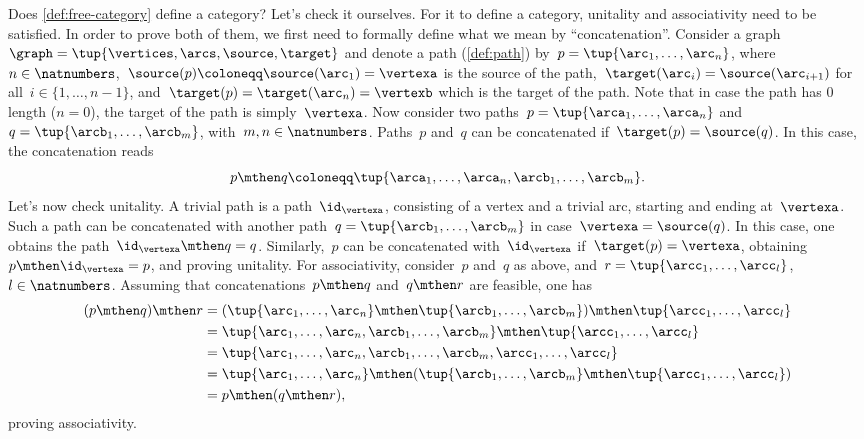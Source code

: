Does \cref{def:free-category} define a category?
Let's check it ourselves.
For it to define a category, unitality and associativity need to be satisfied.
In order to prove both of them, we first need to formally define what we mean by ``concatenation''.
Consider a graph~$\graph=\tup{\vertices,\arcs,\source,\target}$ and denote a path (\cref{def:path}) by~$p=\tup{\arc_1,\ldots, \arc_n}$, where~$n\in \natnumbers$,~$\source(p)\coloneqq\source(\arc_1)=\vertexa$ is the source of the path,~$\target(\arc_i)=\source(\arc_{i+1})$ for all~$i\in \{1,\ldots,n-1\}$, and~$\target(p)=\target(\arc_n)=\vertexb$ which is the target of the path.
Note that in case the path has 0 length ($n=0$), the target of the path is simply~$\vertexa$.
Now consider two paths~$p=\tup{\arca_1,\ldots,\arca_n}$ and~$q=\tup{\arcb_1,\ldots,\arcb_m}$, with~$m,n\in \natnumbers$.
Paths~$p$ and~$q$ can be concatenated if~$\target(p)=\source(q)$.
In this case, the concatenation reads
%
\begin{equation*}
    p\mthen q\coloneqq \tup{\arca_1,\ldots, \arca_n,\arcb_1,\ldots,\arcb_m}.
\end{equation*}
%
Let's now check unitality.
A trivial path is a path~$\id_\vertexa$, consisting of a vertex and a trivial arc, starting and ending at~$\vertexa$.
Such a path can be concatenated with another path~$q=\tup{\arcb_1,\ldots,\arcb_m}$ in case~$\vertexa=\source(q)$.
In this case, one obtains the path~$\id_\vertexa \mthen q=q$.
Similarly,~$p$ can be concatenated with~$\id_\vertexa$ if~$\target(p)=\vertexa$, obtaining~$p\mthen \id_\vertexa=p$, and proving unitality.
For associativity, consider~$p$ and~$q$ as above, and~$r=\tup{\arcc_1,\ldots,\arcc_l}$,~$l\in \natnumbers$.
Assuming that concatenations~$p\mthen q$ and~$q\mthen r$ are feasible, one has
\begin{equation*}
    \begin{aligned}
        (p\mthen q)\mthen r & =(\tup{\arc_1,\ldots, \arc_n}\mthen \tup{\arcb_1,\ldots,\arcb_m})\mthen \tup{\arcc_1,\ldots,\arcc_l}  \\
                            & =\tup{\arc_1,\ldots, \arc_n,\arcb_1,\ldots,\arcb_m}\mthen \tup{\arcc_1,\ldots,\arcc_l}                \\
                            & = \tup{\arc_1,\ldots, \arc_n,\arcb_1,\ldots,\arcb_m, \arcc_1,\ldots,\arcc_l}                          \\
                            & =\tup{\arc_1,\ldots, \arc_n} \mthen (\tup{\arcb_1,\ldots,\arcb_m}\mthen \tup{\arcc_1,\ldots,\arcc_l}) \\
                            & =p\mthen (q\mthen r),
    \end{aligned}
\end{equation*}
proving associativity.

